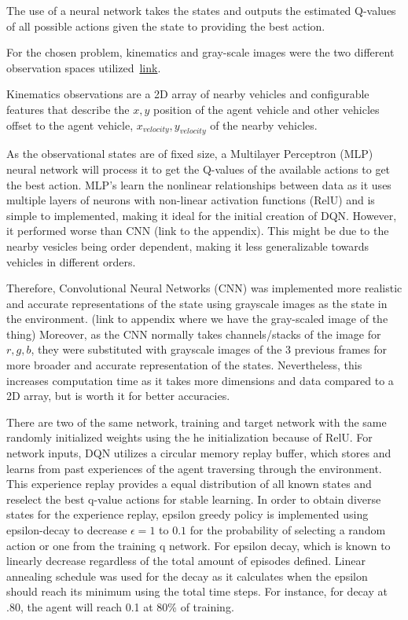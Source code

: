 \documentclass{article}
\begin{document}

The use of a neural network takes the states and outputs the estimated Q-values of all possible actions given the state to providing the best action.



For the chosen problem, kinematics and gray-scale images were the two different observation spaces utilized~\href{https://highway-env.farama.org/observations/}{link}.

Kinematics observations are a 2D array of nearby vehicles and configurable features that describe the \(x, y\) position of the agent vehicle and other vehicles offset to the agent vehicle, \(x_{velocity}, y_{velocity}\) of the nearby vehicles.

As the observational states are of fixed size, a Multilayer Perceptron (MLP) neural network will process it to get the Q-values of the available actions to get the best action.
MLP's learn the nonlinear relationships between data as it uses multiple layers of neurons with non-linear activation functions (RelU) and is simple to implemented, making it ideal for the initial creation of DQN.
However, it performed worse than CNN (link to the appendix).
This might be due to the nearby vesicles being order dependent, making it less generalizable towards vehicles in different orders.

Therefore, Convolutional Neural Networks (CNN) was implemented more realistic and accurate representations of the state using grayscale images as the state in the environment. (link to appendix where we have the gray-scaled image of the thing)
Moreover, as the CNN normally takes channels/stacks of the image for \(r,g,b\), they were substituted with grayscale images of the 3 previous frames for more broader and accurate representation of the states.
Nevertheless, this increases computation time as it takes more dimensions and data compared to a 2D array, but is worth it for better accuracies.

There are two of the same network, training and target network with the same randomly initialized weights using the he initialization because of RelU.
For network inputs, DQN utilizes a circular memory replay buffer, which stores and learns from past experiences of the agent traversing through the environment.
This experience replay provides a equal distribution of all known states and reselect the best q-value actions for stable learning.
In order to obtain diverse states for the experience replay, epsilon greedy policy is implemented using epsilon-decay to decrease  \(\epsilon = 1 \) to \(0.1\) for the probability of selecting a random action or one from the training q network.
For epsilon decay, which is known to linearly decrease regardless of the total amount of episodes defined.
Linear annealing schedule was used for the decay as it calculates when the epsilon should reach its minimum using the total time steps.
For instance, for decay at .80, the agent will reach 0.1 at 80\% of training.
\end{document}
